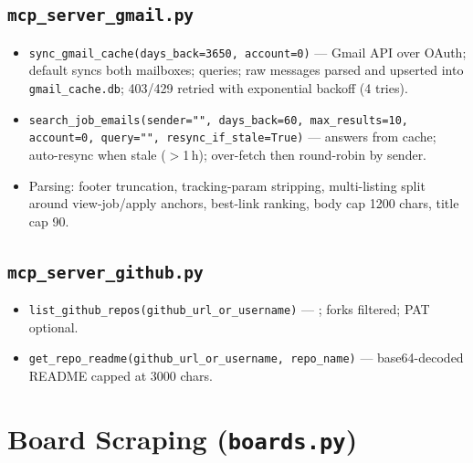 \documentclass[11pt,a4paper]{article}
\newcommand{\file}[1]{\texttt{\small #1}}
\newcommand{\tool}[1]{\texttt{#1}}
\begin{document}
\subsection{\file{mcp\_server\_gmail.py}}
\begin{itemize}[leftmargin=2em]
  \item \tool{sync\_gmail\_cache(days\_back=3650, account=0)} --- Gmail API
        over OAuth; default syncs both mailboxes;
         queries; raw messages parsed
        and upserted into \file{gmail\_cache.db}; 403/429 retried with
        exponential backoff (4 tries).
  \item \tool{search\_job\_emails(sender="", days\_back=60,
        max\_results=10, account=0, query="", resync\_if\_stale=True)} ---
        answers from cache; auto-resync when stale ($>$1\,h); over-fetch
        then  round-robin by sender.
  \item Parsing: footer truncation, tracking-param stripping, multi-listing
        split around view-job/apply anchors, best-link ranking, body cap
        1200 chars, title cap 90.
\end{itemize}

\subsection{\file{mcp\_server\_github.py}}
\begin{itemize}[leftmargin=2em]
  \item \tool{list\_github\_repos(github\_url\_or\_username)} ---
        ;
        forks filtered; PAT optional.
  \item \tool{get\_repo\_readme(github\_url\_or\_username, repo\_name)} ---
        base64-decoded README capped at 3000 chars.
\end{itemize}

\section{Board Scraping (\file{boards.py})}
\label{sec:boards}
\end{document}
